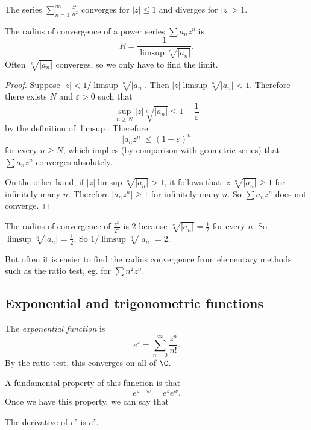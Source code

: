\documentclass[a4paper]{article}
\begin{document}
\begin{eg}
  The series $\displaystyle \sum_{n = 1}^\infty \frac{z^{n}}{n^2}$ converges for $|z| \leq 1$ and diverges for $|z| > 1$.
\end{eg}

\begin{lemma}
  The radius of convergence of a power series $\sum a_nz^n$ is
  \[
    R = \frac{1}{\limsup \sqrt[n]{|a_n|}}.
  \]
  Often $\sqrt[n]{|a_n|}$ converges, so we only have to find the limit.
\end{lemma}

\begin{proof}
  Suppose $|z| < 1/\limsup \sqrt[n]{|a_n|}$. Then $|z| \limsup \sqrt[n]{|a_n|} < 1$. Therefore there exists $N$ and $\varepsilon > 0$ such that
  \[
    \sup_{n \geq N}|z|\sqrt[n]{|a_n|} \leq 1 -  \frac{1}{\varepsilon}
  \]
  by the definition of $\limsup$. Therefore
  \[
    |a_n z^n| \leq (1 - \varepsilon)^n
  \]
  for every $n \geq N$, which implies (by comparison with geometric series) that $\sum a_n z^n$ converges absolutely.

  On the other hand, if $|z|\limsup\sqrt[n]{|a_n|} > 1$, it follows that $|z|\sqrt[n]{|a_n|} \geq 1$ for infinitely many $n$. Therefore $|a_nz^n| \geq 1$ for infinitely many $n$. So $\sum a_nz^n$ does not converge.
\end{proof}

\begin{eg}
  The radius of convergence of $\displaystyle \frac{z^n}{2^n}$ is $2$ because $\sqrt[n]{|a_n|} = \frac{1}{2}$ for every $n$. So $\limsup \sqrt[n]{|a_n|} = \frac{1}{2}$. So $1/\limsup \sqrt[n]{|a_n|} = 2$.
\end{eg}

But often it is easier to find the radius convergence from elementary methods such as the ratio test, eg. for $\sum n^2 z^n$.

\subsection{Exponential and trigonometric functions}
\begin{defi}
  The \emph{exponential function} is
  \[
    e^z = \sum_{n = 0}^\infty \frac{z^n}{n!}.
  \]
  By the ratio test, this converges on all of $\C$.
\end{defi}
A fundamental property of this function is that
\[
  e^{z + w} = e^ze^w.
\]
Once we have this property, we can say that
\begin{prop}
  The derivative of $e^z$ is $e^z$.
\end{prop}
\end{document}
